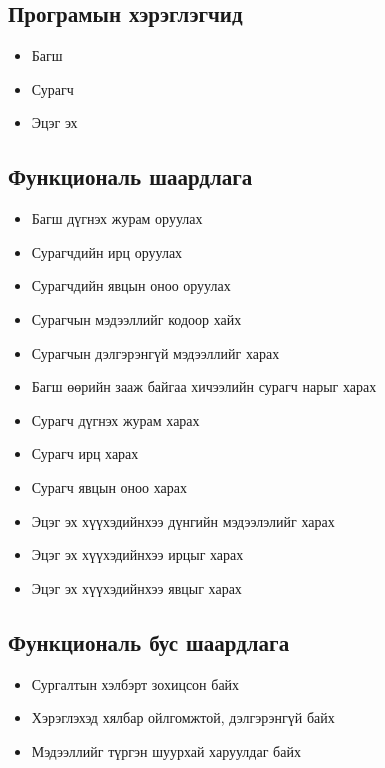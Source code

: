 \documentclass[12pd]{article}
\begin{document}
	\subsection { Програмын хэрэглэгчид }
	\begin{itemize}
		\item Багш
		\item Сурагч 
		\item Эцэг эх
	\end{itemize}
	\subsection {Функциональ шаардлага}
		\begin{itemize}
		\item Багш дүгнэх журам оруулах
		\item Сурагчдийн ирц оруулах
		\item Сурагчдийн явцын оноо оруулах 
		\item Сурагчын мэдээллийг кодоор хайх
		\item Сурагчын дэлгэрэнгүй мэдээллийг харах
		\item Багш өөрийн зааж байгаа хичээлийн сурагч нарыг харах
		\item Сурагч дүгнэх журам харах
		\item Сурагч ирц харах
		\item Сурагч явцын оноо харах
		\item Эцэг эх хүүхэдийнхээ дүнгийн мэдээлэлийг харах
		\item Эцэг эх хүүхэдийнхээ ирцыг харах
		\item Эцэг эх хүүхэдийнхээ явцыг харах
	\end{itemize}
	
	\subsection{ Функциональ бус шаардлага}
	\begin{itemize}
		\item Сургалтын хэлбэрт зохицсон байх
		\item Хэрэглэхэд хялбар ойлгомжтой, дэлгэрэнгүй байх
		\item Мэдээллийг түргэн шуурхай харуулдаг байх
	\end{itemize}
	
\end{document}
